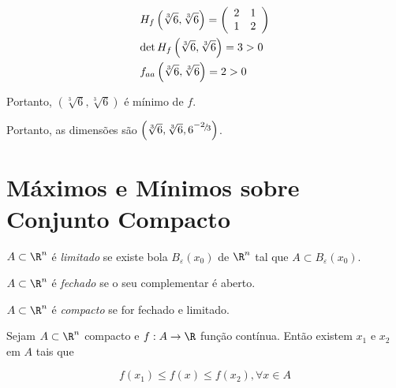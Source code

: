 \documentclass{book}
\begin{document}
\begin{sol}
\[
\begin{gathered}
H_f \left( {\sqrt[3]{6},\sqrt[3]{6}} \right) = \left( {\begin{array}{*{20}c}
2 & 1  \\
1 & 2  \\

\end{array} } \right) \hfill \\
\det H_f \left( {\sqrt[3]{6},\sqrt[3]{6}} \right) = 3 > 0 \hfill \\
f_{aa} \left( {\sqrt[3]{6},\sqrt[3]{6}} \right) = 2 > 0 \hfill \\
\end{gathered}
\]

Portanto, $\left( {\sqrt[3]{6},\sqrt[3]{6}} \right)$ \'e m\'inimo de $f$.

    Portanto, as dimens\~oes s\~ao $\left( {\sqrt[3]{6},\sqrt[3]{6},6^{{\raise0.5ex\hbox{$\scriptstyle { - 2}$}
\kern-0.1em/\kern-0.15em
\lower0.25ex\hbox{$\scriptstyle 3$}}} } \right)$.
\end{sol}

\section{M\'aximos e M\'inimos sobre Conjunto Compacto} \label{sec22}

\begin{defn}
    $A \subset \R^n$ \'e \textit{limitado} se existe bola $B_\varepsilon  \left( {x_0 } \right)$ de $\R^n$ tal que $A \subset B_\varepsilon  \left( {x_0 } \right)$.
\end{defn}

\begin{defn}
$A \subset \R^n$ \'e \textit{fechado} se o seu complementar \'e aberto.
\end{defn}

\begin{defn}
$A \subset \R^n$ \'e \textit{compacto} se for fechado e limitado.
\end{defn}

\begin{teo}
    Sejam $A \subset \R^n$ compacto e $f:A \to \R$ fun\c c\~ao cont\'inua. Ent\~ao existem $x_1$ e $x_2$ em $A$ tais que

\[
    f\left( {x_1 } \right) \leqslant f\left( x \right) \leqslant f\left( {x_2 } \right),\forall x \in A
\]

\end{teo}
\end{document}
